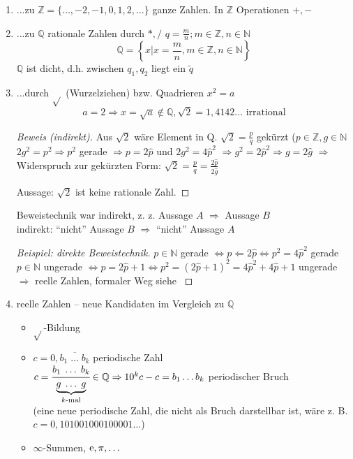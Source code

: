 \begin{enumerate}
 \item ...zu $\mathbb{Z} = \{\ldots,-2,-1,0,1,2,\ldots\}$ ganze Zahlen. In $\mathbb{Z}$ Operationen $+,-$
 \item ...zu $\mathbb{Q}$ rationale Zahlen durch $*,/$ $q=\frac{m}{n}; m \in \mathbb{Z}, n \in \mathbb{N}$
  \begin{equation*}\mathbb{Q} = \left\{x | x=\frac{m}{n}, m \in \mathbb{Z}, n \in \mathbb{N} \right\}\end{equation*}
  $\mathbb{Q}$ ist dicht, d.h. zwischen $q_1, q_2$ liegt ein $\tilde{q}$
 \item ...durch $\sqrt{}$ (Wurzelziehen) bzw. Quadrieren $x^2=a$
 \begin{equation*}a=2 \Rightarrow x = \sqrt{a} \notin \mathbb{Q}, \sqrt{2}=1,4142\ldots\text{ irrational}\end{equation*}

\begin{proof}[Beweis (indirekt)]
Aus $\sqrt{2}$ wäre Element in Q. $\sqrt{2}=\frac{p}{q}$ gekürzt ($p \in \mathbb{Z}, g \in \mathbb{N}$
$2g^2=p^2 \Rightarrow p^2$ gerade $\Rightarrow p=2\hat{p}$ und $2g^2=4\hat{p}^2$
$\Rightarrow g^2 = 2\hat{p}^2 \Rightarrow g=2\hat{g}$ 
$\Rightarrow$ Widerspruch zur gekürzten Form: $\sqrt{2}=\frac{p}{q}=\frac{2\hat{p}}{2\hat{g}}$

Aussage: $\sqrt{2}$ ist keine rationale Zahl.
\end{proof}

Beweistechnik war indirekt, z. z. Aussage $A$ $\Rightarrow$ Aussage $B$\\
indirekt: "`nicht"' Aussage $B$ $\Rightarrow$ "`nicht"' Aussage $A$


\begin{proof}[Beispiel: direkte Beweistechnik]

$p \in \mathbb{N}$ gerade $\Leftrightarrow p \Leftarrow 2 \hat{p} \Leftrightarrow p^2 = 4\hat{p}^2$ gerade\\
$p \in \mathbb{N}$ ungerade $\Leftrightarrow p = 2 \hat{p}+1 \Leftrightarrow p^2 = (2\hat{p}+1)^2=4\hat{p}^2+4\hat{p}+1$ ungerade\\
$\Rightarrow$ reelle Zahlen, formaler Weg siehe \cite[S. 9ff]{bornemann}
\end{proof}

 \item reelle Zahlen -- neue Kandidaten im Vergleich zu $\mathbb{Q}$
\begin{itemize}
 \item $\sqrt{}$-Bildung
 \item $c = 0,\overline{b_1 \;\ldots\; b_k}$ periodische Zahl\\
$c = \cfrac{b_1 \;\ldots\; b_k}{\underbrace{g \;\ldots\; g}_{k\text{-mal}}} \in \mathbb{Q} \Rightarrow 10^k c -c = b_1 \ldots b_k$ periodischer Bruch\\
(eine neue periodische Zahl, die nicht als Bruch darstellbar ist, wäre z. B. $c=0,101001000100001\ldots$)
 \item $\infty$-Summen, $\operatorname{e}, \pi,\ldots$
\end{itemize}

\end{enumerate}

